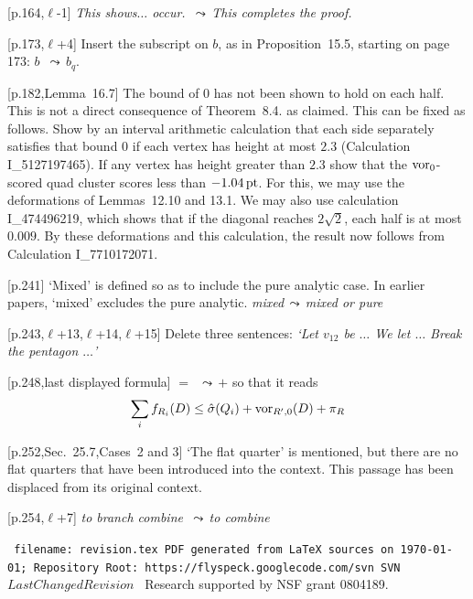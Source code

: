 \documentclass[11pt]{amsart}
\def\svninfo{{\tt
  filename: revision.tex\hfill\break
  PDF generated from LaTeX sources on \today; \hfill\break
  Repository Root: https://flyspeck.googlecode.com/svn \hfill\break
  SVN $LastChangedRevision$
  }
  }
\def\op#1{{\text{#1}}}
\def\lto{\ensuremath{\,\leadsto\,}}
\def\line{$\ell$}
\def\text{\hbox}
\def\sz{small} %
\def\rmx{\rm}
\begin{document}
\begin{\sz}
[p.164,\line-1] 
	{\it This shows$\ldots$ occur.
	\lto This completes the proof.}


[p.173,\line+4] {\rmx Insert the subscript on $b$,
as in Proposition~15.5, starting on page 173:}
   $b$ \lto $b_q$.



	
[p.182,Lemma~16.7]  {\rmx The bound of $0$ has not been
shown to hold on each half.  This is not a 
direct consequence
of Theorem~8.4. as claimed.
This can be fixed as follows.  Show by an interval arithmetic
calculation that each side separately satisfies
that bound $0$ if each vertex has height at most $2.3$ (Calculation I\_5127197465).
If any vertex has height greater than $2.3$ show that the $\op{vor}_0$-scored quad cluster scores
less than $-1.04\,\op{pt}$.  
For this, we may use the deformations of Lemmas~12.10 and 13.1.  We may also use calculation I\_474496219, which shows that if the diagonal reaches $2\sqrt2$, each half is at most $0.009$.  
By these deformations and this calculation, the result now follows from Calculation I\_7710172071.}


[p.241]  {\rmx `Mixed' is defined so as to include
the pure analytic case.  In earlier papers,
`mixed' excludes the pure analytic.  }
	{\it mixed\lto mixed or pure}
	
[p.243,\line+13,\line+14,\line+15]
	{\rmx Delete three sentences:}
	{\it `Let $v_{12}$ be $\ldots$  We let $\ldots$
	 Break the pentagon $\ldots$'}
	
[p.248,last displayed formula]  
	$=$ \lto $+$
{\rmx so that it reads}
	$$
	\sum_i f_{R_i}(D) \le \hat\sigma(Q_i) +
	\op{vor}_{R',0}(D) + \pi_R
	$$

[p.252,Sec.~25.7,Cases~2 and 3]  {\rmx `The flat quarter'
is mentioned, but there are no flat quarters
that have been introduced into the context.  
This passage
has been displaced from its original context.}

[p.254,\line+7]
{\it to branch combine \lto to combine}
\end{\sz}






\bigskip

\begin{\sz}
\svninfo\hfill\break
{Research supported by NSF grant 0804189.}
\end{\sz}
\end{document}

